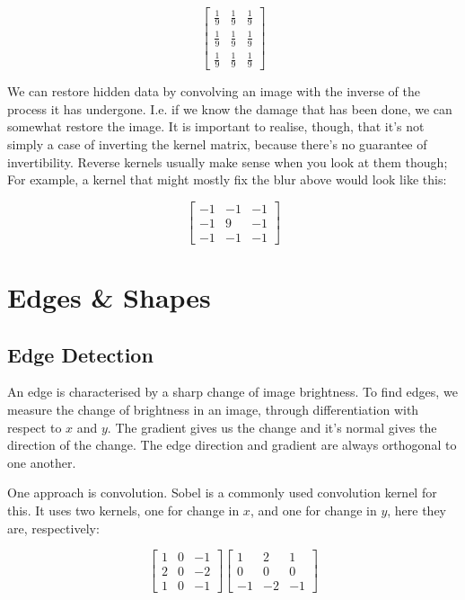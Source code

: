 \documentclass{article}
\begin{document}
        $$\begin{bmatrix}
            \frac{1}{9} & \frac{1}{9} & \frac{1}{9} \\[0.4em]
            \frac{1}{9} & \frac{1}{9} & \frac{1}{9} \\[0.4em]
            \frac{1}{9} & \frac{1}{9} & \frac{1}{9}
        \end{bmatrix}$$

        We can restore hidden data by convolving an image with the inverse of the process it has undergone. I.e. if we know the damage that has been done, we can somewhat restore the image. It is important to realise, though, that it's not simply a case of inverting the kernel matrix, because there's no guarantee of invertibility. Reverse kernels usually make sense when you look at them though; For example, a kernel that might mostly fix the blur above would look like this:
        
        $$\begin{bmatrix}
            -1 & -1 & -1 \\[0.1em]
            -1 & 9 & -1 \\[0.1em]
            -1 & -1 & -1
        \end{bmatrix}$$

\section{Edges \& Shapes}
    \subsection{Edge Detection}
        An edge is characterised by a sharp change of image brightness. To find edges, we measure the change of brightness in an image, through differentiation with respect to $x$ and $y$. The gradient gives us the change and it’s normal gives the direction of the change. The edge direction and gradient are always orthogonal to one another.
        
        One approach is convolution. Sobel is a commonly used convolution kernel for this. It uses two kernels, one for change in $x$, and one for change in $y$, here they are, respectively:
        
            $$\begin{bmatrix}
                1 & 0 & -1 \\[0.1em]
                2 & 0 & -2 \\[0.1em]
                1 & 0 & -1
            \end{bmatrix}
            \begin{bmatrix}
                1 & 2 & 1 \\[0.1em]
                0 & 0 & 0 \\[0.1em]
                -1 & -2 & -1
            \end{bmatrix}$$
            
\end{document}
